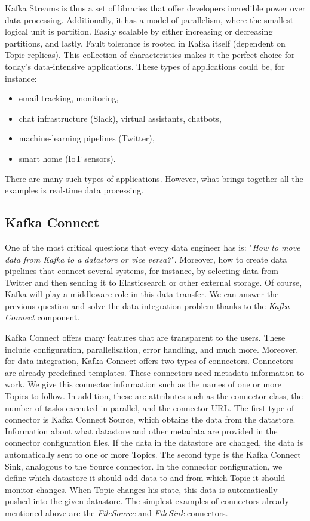 Kafka Streams is thus a set of libraries that offer developers incredible power over data processing.
Additionally, it has a model of parallelism, where the smallest logical unit is partition.
Easily scalable by either increasing or decreasing partitions, and lastly, Fault tolerance is rooted in Kafka itself (dependent on Topic replicas).
This collection of characteristics makes it the perfect choice for today's data-intensive applications.
These types of applications could be, for instance:
\begin{itemize}[itemsep=1mm, parsep=0pt]
    \item email tracking, monitoring,
    \item chat infrastructure (Slack), virtual assistants, chatbots,
    \item machine-learning pipelines (Twitter),
    \item smart home (IoT sensors).
\end{itemize}
There are many such types of applications.
However, what brings together all the examples is real-time data processing.

\subsection{Kafka Connect}

One of the most critical questions that every data engineer has is: "\emph{How to move data from Kafka to a datastore or vice versa?}".
Moreover, how to create data pipelines that connect several systems, for instance, by selecting data from Twitter and then sending it to Elasticsearch or other external storage.
Of course, Kafka will play a middleware role in this data transfer.
We can answer the previous question and solve the data integration problem thanks to the \emph{Kafka Connect} component.

Kafka Connect offers many features that are transparent to the users.
These include configuration, parallelisation, error handling, and much more.
Moreover, for data integration, Kafka Connect offers two types of connectors.
Connectors are already predefined templates.
These connectors need metadata information to work.
We give this connector information such as the names of one or more Topics to follow.
In addition, these are attributes such as the connector class, the number of tasks executed in parallel, and the connector URL.
The first type of connector is Kafka Connect Source, which obtains the data from the datastore.
Information about what datastore and other metadata are provided in the connector configuration files.
If the data in the datastore are changed, the data is automatically sent to one or more Topics.
The second type is the Kafka Connect Sink, analogous to the Source connector.
In the connector configuration, we define which datastore it should add data to and from which Topic it should monitor changes.
When Topic changes his state, this data is automatically pushed into the given datastore.
The simplest examples of connectors already mentioned above are the \emph{FileSource} and \emph{FileSink} connectors.

